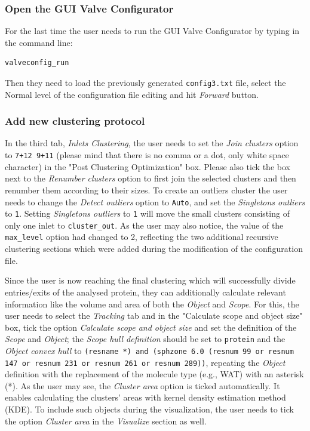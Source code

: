 \documentclass[9pt,tutorial, pubversion]{livecoms}
\begin{document}
\subsubsection{Open the GUI Valve Configurator}
For the last time the user needs to run the GUI Valve Configurator by typing in the command line:
\begin{lstlisting}
valveconfig_run
\end{lstlisting}
Then they need to load the previously generated \texttt{config3.txt} file, select the Normal level of the configuration file editing and hit \textit{Forward} button. 

\subsubsection{Add new clustering protocol}
In the third tab, \textit{Inlets Clustering}, the user needs to set the \emph{Join clusters} option to \texttt{7+12 9+11} (please mind that there is no comma or a dot, only white space character) in the "Post Clustering Optimization" box. Please also tick the box next to the \emph{Renumber clusters} option to first join the selected clusters and then renumber them according to their sizes. To create an outliers cluster the user needs to change the \emph{Detect outliers} option to \texttt{Auto}, and set the \emph{Singletons outliers} to \texttt{1}. Setting \emph{Singletons outliers} to \texttt{1} will move the small clusters consisting of only one inlet to \texttt{cluster\_out}. As the user may also notice, the value of the \texttt{max\_level} option had changed to 2, reflecting the two additional recursive clustering sections which were added during the modification of the configuration file. 

Since the user is now reaching the final clustering which will successfully divide entries/exits of the analysed protein, they can additionally calculate relevant information like the volume and area of both the \textit{Object} and \textit{Scope}. For this, the user needs to select the \textit{Tracking} tab and in the "Calculate scope and object size" box, tick the option \textit{Calculate scope and object size} and set the definition of the \textit{Scope} and \textit{Object}; the \textit{Scope hull definition} should be set to \texttt{protein} and the \textit{Object convex hull} to \texttt{(resname *) and (sphzone 6.0 (resnum 99 or resnum 147 or resnum 231 or resnum 261 or resnum 289))}, repeating the \textit{Object} definition with the replacement of the molecule type (e.g., WAT) with an asterisk (*). As the user may see, the \textit{Cluster area} option is ticked automatically. It enables calculating the clusters’ areas with kernel density estimation method (KDE). To include such objects during the visualization, the user needs to tick the option \textit{Cluster area} in the \textit{Visualize} section as well. 
\end{document}
